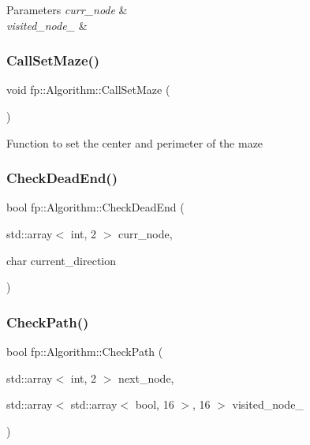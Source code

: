 \begin{DoxyParams}{Parameters}
{\em curr\+\_\+node} & \\
\hline
{\em visited\+\_\+node\+\_\+} & \\
\hline
\end{DoxyParams}
\mbox{\label{classfp_1_1_algorithm_a434cfecd6898f4e89ba632433fa19afd}} 
\subsubsection{\texorpdfstring{Call\+Set\+Maze()}{CallSetMaze()}}
{\footnotesize\ttfamily void fp\+::\+Algorithm\+::\+Call\+Set\+Maze (\begin{DoxyParamCaption}{ }\end{DoxyParamCaption})}

Function to set the center and perimeter of the maze \mbox{\label{classfp_1_1_algorithm_a2309270f8f6276d6f421328239269d3a}} 
\subsubsection{\texorpdfstring{Check\+Dead\+End()}{CheckDeadEnd()}}
{\footnotesize\ttfamily bool fp\+::\+Algorithm\+::\+Check\+Dead\+End (\begin{DoxyParamCaption}\item[{std\+::array$<$ int, 2 $>$}]{curr\+\_\+node,  }\item[{char}]{current\+\_\+direction }\end{DoxyParamCaption})}

\mbox{\label{classfp_1_1_algorithm_a9270347a0ca5be0f7717e6772de5f87c}} 
\subsubsection{\texorpdfstring{Check\+Path()}{CheckPath()}}
{\footnotesize\ttfamily bool fp\+::\+Algorithm\+::\+Check\+Path (\begin{DoxyParamCaption}\item[{std\+::array$<$ int, 2 $>$}]{next\+\_\+node,  }\item[{std\+::array$<$ std\+::array$<$ bool, 16 $>$, 16 $>$}]{visited\+\_\+node\+\_\+ }\end{DoxyParamCaption})}

